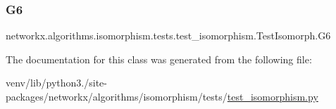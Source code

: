 \subsubsection{\texorpdfstring{G6}{G6}}
{\footnotesize\ttfamily networkx.\+algorithms.\+isomorphism.\+tests.\+test\+\_\+isomorphism.\+Test\+Isomorph.\+G6}



The documentation for this class was generated from the following file\+:\begin{DoxyCompactItemize}
\item 
venv/lib/python3./site-\/packages/networkx/algorithms/isomorphism/tests/\hyperlink{test__isomorphism_8py}{test\+\_\+isomorphism.\+py}\end{DoxyCompactItemize}
